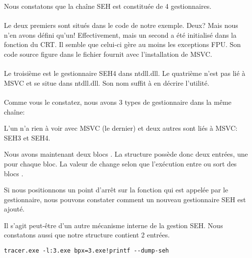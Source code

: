 Nous constatons que la chaîne SEH est constituée de 4 gestionnaires.\\
\\
Le deux premiers sont situés dans le code de notre exemple. Deux? Mais nous n'en avons défini qu'un!
Effectivement, mais un second a été initialisé dans la fonction  du \ac{CRT}.
Il semble que celui-ci gère au moins les exceptions \ac{FPU}.
Son code source figure dans le fichier  fournit avec l'installation de MSVC.\\
\\
Le troisième est le gestionnaire SEH4 dans ntdll.dll.
Le quatrième n'est pas lié à MSVC et se situe dans ntdll.dll. Son nom suffit à en décrire l'utilité.\\
\\
Comme vous le constatez, nous avons 3 types de gestionnaire dans la même chaîne:

L'un n'a rien à voir avec MSVC (le dernier) et deux autres sont liés à MSVC: SEH3 et SEH4.




Nous avons maintenant deux blocs .
La structure  possède donc deux entrées, une pour chaque bloc.
La valeur de  change selon que l'exécution entre ou sort des blocs .



Si nous positionnons un point d'arrêt sur la fonction \printf{} qui est appelée par le gestionnaire, 
nous pouvons constater comment un nouveau gestionnaire SEH est ajouté.

Il s'agit peut-être d'un autre mécanisme interne de la gestion SEH.
Nous constatons aussi que notre structure  contient 2 entrées.

\begin{lstlisting}
tracer.exe -l:3.exe bpx=3.exe!printf --dump-seh
\end{lstlisting}


